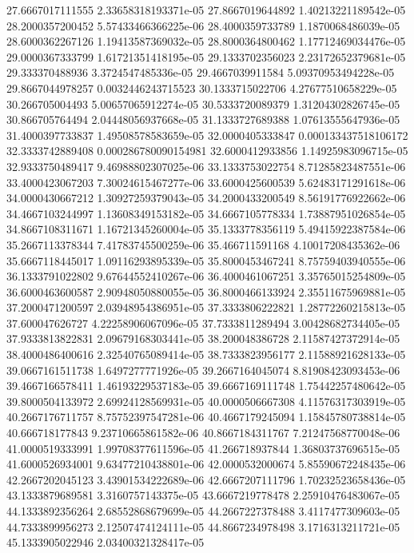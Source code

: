 {27.6667017111555 2.33658318193371e-05
27.8667019644892 1.40213221189542e-05
28.2000357200452 5.57433466366225e-06
28.4000359733789 1.1870068486039e-05
28.6000362267126 1.19413587369032e-05
28.8000364800462 1.17712469034476e-05
29.0000367333799 1.61721351418195e-05
29.1333702356023 2.23172652379681e-05
29.333370488936 3.3724547485336e-05
29.4667039911584 5.09370953494228e-05
29.8667044978257 0.0032446243715523
30.1333715022706 4.27677510658229e-05
30.266705004493 5.00657065912274e-05
30.5333720089379 1.31204302826745e-05
30.866705764494 2.04448056937668e-05
31.1333727689388 1.07613555647936e-05
31.4000397733837 1.49508578583659e-05
32.0000405333847 0.000133437518106172
32.3333742889408 0.000286780090154981
32.6000412933856 1.14925983096715e-05
32.9333750489417 9.46988802307025e-06
33.1333753022754 8.71285823487551e-06
33.4000423067203 7.30024615467277e-06
33.6000425600539 5.62483171291618e-06
34.0000430667212 1.30927259379043e-05
34.2000433200549 8.56191776922662e-06
34.4667103244997 1.13608349153182e-05
34.6667105778334 1.73887951026854e-05
34.8667108311671 1.16721345260004e-05
35.1333778356119 5.49415922387584e-06
35.2667113378344 7.41783745500259e-06
35.466711591168 4.10017208435362e-06
35.6667118445017 1.09116293895339e-05
35.8000453467241 8.75759403940555e-06
36.1333791022802 9.67644552410267e-06
36.4000461067251 3.35765015254809e-05
36.6000463600587 2.90948050880055e-05
36.8000466133924 2.35511675969881e-05
37.2000471200597 2.03948954386951e-05
37.3333806222821 1.28772260215813e-05
37.600047626727 4.22258906067096e-05
37.7333811289494 3.00428682734405e-05
37.9333813822831 2.09679168303441e-05
38.200048386728 2.11587427372914e-05
38.4000486400616 2.32540765089414e-05
38.7333823956177 2.11588921628133e-05
39.0667161511738 1.6497277771926e-05
39.2667164045074 8.81908423093453e-06
39.4667166578411 1.46193229537183e-05
39.6667169111748 1.75442257480642e-05
39.8000504133972 2.69924128569931e-05
40.0000506667308 4.11576317303919e-05
40.2667176711757 8.75752397547281e-06
40.4667179245094 1.15845780738814e-05
40.666718177843 9.23710665861582e-06
40.8667184311767 7.21247568770048e-06
41.0000519333991 1.99708377611596e-05
41.266718937844 1.36803737696515e-05
41.6000526934001 9.63477210438801e-06
42.0000532000674 5.85590672248435e-06
42.2667202045123 3.43901534222689e-06
42.6667207111796 1.70232523658436e-05
43.1333879689581 3.3160757143375e-05
43.6667219778478 2.25910476483067e-05
44.1333892356264 2.68552868679699e-05
44.2667227378488 3.4117477309603e-05
44.7333899956273 2.12507474124111e-05
44.8667234978498 3.1716313211721e-05
45.1333905022946 2.03400321328417e-05
}
